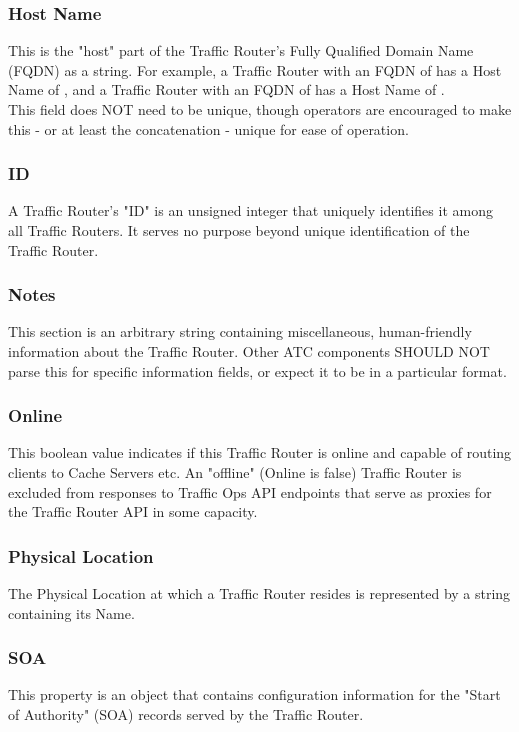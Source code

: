 \subsubsection{Host Name}
This is the "host" part of the Traffic Router's Fully Qualified Domain Name
(FQDN) as a string. For example, a Traffic Router with an FQDN of
 has a Host Name of , and a Traffic Router with an
FQDN of  has a Host Name of
.\\
This field does NOT need to be unique, though operators are encouraged to make
this - or at least the concatenation  - unique
for ease of operation.

\subsubsection{ID}
A Traffic Router's "ID" is an unsigned integer that uniquely identifies it among
all Traffic Routers. It serves no purpose beyond unique identification of the
Traffic Router.

\subsubsection{Notes}
This section is an arbitrary string containing miscellaneous, human-friendly
information about the Traffic Router. Other ATC components SHOULD NOT parse this
for specific information fields, or expect it to be in a particular format.

\subsubsection{Online}
This boolean value indicates if this Traffic Router is online and capable of
routing clients to Cache Servers etc. An "offline" (Online is false) Traffic
Router is excluded from responses to Traffic Ops API endpoints that serve as
proxies for the Traffic Router API in some capacity.

\subsubsection{Physical Location}
The Physical Location at which a Traffic Router resides is represented by a
string containing its Name.

\subsubsection{SOA}
This property is an object that contains configuration information for the
"Start of Authority" (SOA) records served by the Traffic Router.

